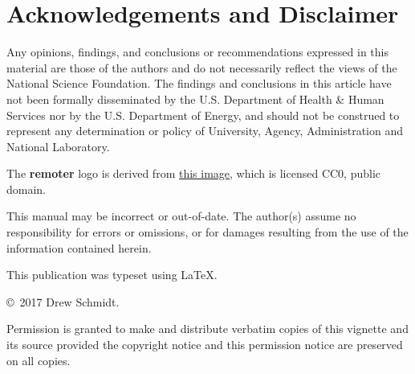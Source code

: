 \section*{Acknowledgements and Disclaimer}
Any opinions, findings, and conclusions or recommendations expressed in  this 
material are those of the authors and do not necessarily reflect the  views of 
the National Science Foundation.  The findings and conclusions in this article 
have not been formally disseminated by the U.S. Department of Health \& Human 
Services nor by the U.S. Department of Energy, and should not be construed to 
represent any determination or policy of University, Agency, Administration and 
National Laboratory.

The \textbf{remoter} logo is derived from
\href{https://pixabay.com/en/ghettoblaster-boombox-old-school-1225920/}{this image},
which is licensed CC0, public domain.

This manual may be incorrect or out-of-date.  The author(s) assume
no responsibility for errors or omissions, or for damages resulting
from the use of the information contained herein.

This publication was typeset using \LaTeX.

\vfill

\null
\vfill
\copyright\ 2017 Drew Schmidt.

Permission is granted to make and distribute verbatim copies of
this vignette and its source provided the copyright notice and
this permission notice are preserved on all copies.

